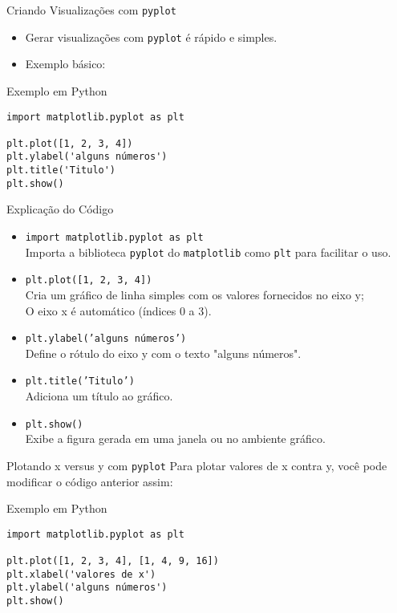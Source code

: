 \begin{frame}[fragile]{Criando Visualizações com \texttt{pyplot}}
    \begin{itemize}
        \item Gerar visualizações com \texttt{pyplot} é rápido e simples.
        \item Exemplo básico:
    \end{itemize}

    \begin{block}{Exemplo em Python}
    \begin{verbatim}
import matplotlib.pyplot as plt

plt.plot([1, 2, 3, 4])
plt.ylabel('alguns números')
plt.title('Titulo')
plt.show()
    \end{verbatim}
    \end{block}
\end{frame}

\begin{frame}{Explicação do Código}
    \begin{itemize}
        \item \texttt{import matplotlib.pyplot as plt} \\
        Importa a biblioteca \texttt{pyplot} do \texttt{matplotlib}  como \texttt{plt} para facilitar o uso.
        \item \texttt{plt.plot([1, 2, 3, 4])} \\
        Cria um gráfico de linha simples com os valores fornecidos no eixo y;\\ O eixo x é automático (índices 0 a 3).
        \item \texttt{plt.ylabel('alguns números')} \\
        Define o rótulo do eixo y com o texto "alguns números".
        \item \texttt{plt.title('Titulo')} \\
        Adiciona um título ao gráfico.
        \item \texttt{plt.show()} \\
        Exibe a figura gerada em uma janela ou no ambiente gráfico.
    \end{itemize}
\end{frame}


\begin{frame}[fragile]{Plotando x versus y com \texttt{pyplot}}
    Para plotar valores de x contra y, você pode modificar o código anterior assim:

    \begin{block}{Exemplo em Python}
\begin{verbatim}
import matplotlib.pyplot as plt

plt.plot([1, 2, 3, 4], [1, 4, 9, 16])
plt.xlabel('valores de x')
plt.ylabel('alguns números')
plt.show()
\end{verbatim}
    \end{block}
\end{frame}

